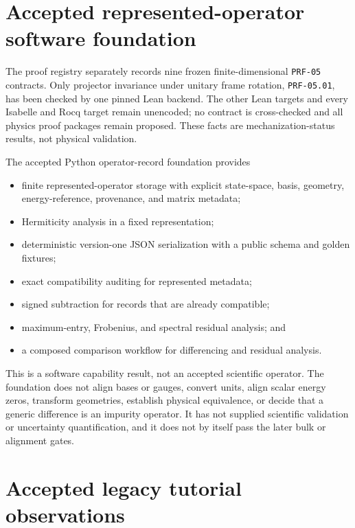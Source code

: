 \section{Accepted represented-operator software foundation}



The proof registry separately records nine frozen finite-dimensional
\texttt{PRF-05} contracts. Only projector invariance under unitary frame
rotation, \texttt{PRF-05.01}, has been checked by one pinned Lean backend. The
other Lean targets and every Isabelle and Rocq target remain unencoded; no
contract is cross-checked and all physics proof packages remain proposed. These
facts are mechanization-status results, not physical validation.

The accepted Python operator-record foundation provides

\begin{itemize}
  \item finite represented-operator storage with explicit state-space, basis,
    geometry, energy-reference, provenance, and matrix metadata;
  \item Hermiticity analysis in a fixed representation;
  \item deterministic version-one JSON serialization with a public schema and
    golden fixtures;
  \item exact compatibility auditing for represented metadata;
  \item signed subtraction for records that are already compatible;
  \item maximum-entry, Frobenius, and spectral residual analysis; and
  \item a composed comparison workflow for differencing and residual analysis.
\end{itemize}

This is a software capability result, not an accepted scientific operator. The
foundation does not align bases or gauges, convert units, align scalar energy
zeros, transform geometries, establish physical equivalence, or decide that a
generic difference is an impurity operator. It has not supplied scientific
validation or uncertainty quantification, and it does not by itself pass the
later bulk or alignment gates.

\section{Accepted legacy tutorial observations}


